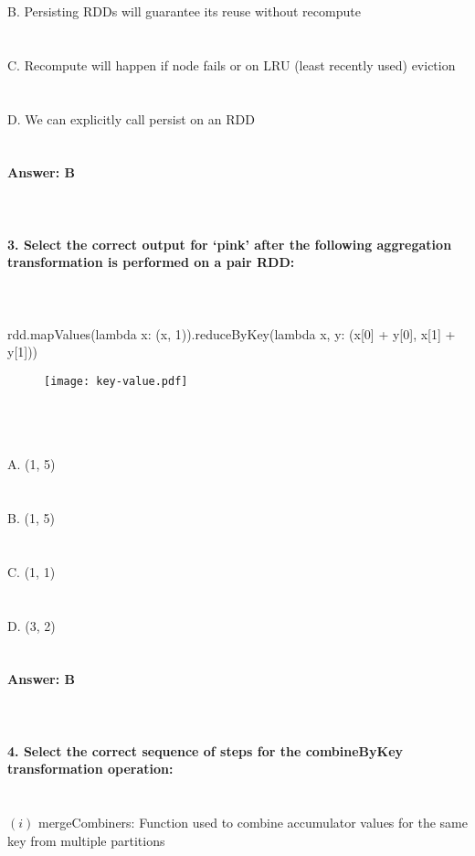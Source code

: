 \documentclass[prl,twocolumn,showpacs,preprintnumbers,superscriptaddress]{revtex4}
\theoremstyle{plain}
\theoremstyle{definition}
\begin{document}
\begin{widetext}
B. Persisting RDDs will guarantee its reuse without recompute\\
\\
\\
C. Recompute will happen if node fails or on LRU (least recently used) eviction\\
\\
\\
D. We can explicitly call persist on an RDD
\\
\\
\\
\textbf{Answer: B}
\\
\\
\\
\\
\newpage
\textbf{3. Select the correct output for ‘pink’ after the following aggregation transformation is performed on a pair RDD:}
\\
\\
\\
\\
rdd.mapValues(lambda x: (x, 1)).reduceByKey(lambda x, y: (x[0] + y[0], x[1] + y[1])) 
\begin{figure}[H]
\begin{center}
    \texttt{[image: key-value.pdf]}
\end{center}
\end{figure}
\\
\\
\\
\noindent A. (1, 5)\\
\\
\\
B. (1, 5)\\
\\
\\
C. (1, 1)\\
\\
\\
D. (3, 2)
\\
\\
\\
\textbf{Answer: B}
\\
\\
\\
\\
\textbf{4. Select the correct sequence of steps for the combineByKey transformation operation:}  
\\
\\
\\
$(i)$ mergeCombiners: Function used to combine accumulator values for the same key from multiple partitions 

\end{widetext}
\end{document}
